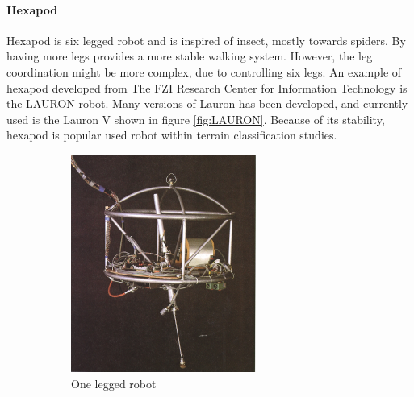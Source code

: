 \documentclass[USenglish]{ifimaster}  %
\begin{document}
\paragraph{Hexapod}
Hexapod is six legged robot and is inspired of insect, mostly towards spiders. By having more legs provides a more stable walking system. However, the leg coordination might be more complex, due to controlling six legs. An example of hexapod developed from The FZI Research Center for Information Technology is the LAURON robot. Many versions of Lauron has been developed, and currently used is the Lauron V shown in figure \ref{fig:LAURON}. Because of its stability, hexapod is popular used robot within terrain classification studies.

\begin{figure}
	\centering
	\begin{subfigure}[b]{0.22\textwidth}
		\centering
		\includegraphics[width=\linewidth]{Figures/Hopper}
		\caption{One legged robot \cite{Raibert:1986:LR:5948.5950}}
		\label{fig:onlegg}
	\end{subfigure}\hfill
	\begin{subfigure}[b]{0.22\textwidth}

\end{subfigure}
\end{figure}
\end{document}
